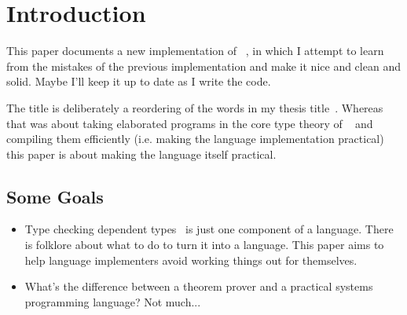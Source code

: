 \section{Introduction}

This paper documents a new implementation of \Idris{}~\cite{Brady2011a}, in which
I attempt to learn from the mistakes of the previous implementation and make
it nice and clean and solid. Maybe I'll keep it up to date as I write the
code.

The title is deliberately a reordering of the words in my thesis
title~\cite{Brady2005}. Whereas that was about taking elaborated programs
in the core type theory of \Epigram{}~\cite{McBride2004a} and compiling them
efficiently (i.e. making the language implementation practical) this paper is
about making the language itself practical. 

\subsection{Some Goals}

\begin{itemize}
\item Type checking dependent types~\cite{Chapman2005epigram,loh2010tutorial} is just one component
 of a language. There is folklore about what to do to turn it into a language. This
 paper aims to help language implementers avoid working things out for themselves.
\item What's the difference between a theorem prover and a practical systems programming
 language? Not much...
\end{itemize}

